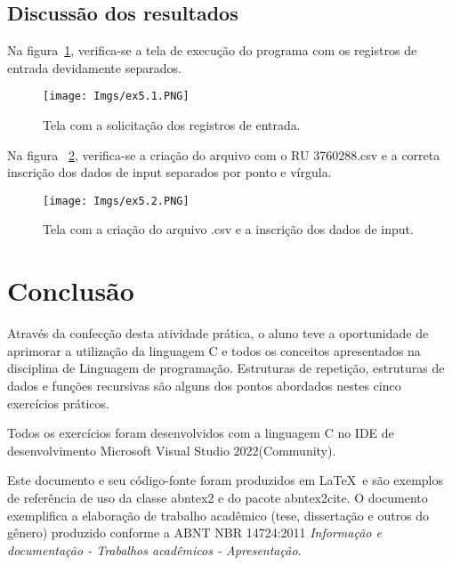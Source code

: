 \documentclass[
	12pt,				%
	openright,			%
	oneside,			%
	a4paper,			%
	chapter=TITLE,		%
	section=TITLE,		%
	english,			%
	french,				%
	spanish,			%
	brazil				%
	]{abntex2}
\begin{document}
\section[DISCUSSÃO DOS RESULTADOS]{Discussão dos resultados}

	Na figura~\ref{fig:ex5.1}, verifica-se a tela de execução do programa com os registros de entrada devidamente separados. 
	
	\begin{figure}[htp]
		\begin{center}
			\caption{Tela com a solicitação dos registros de entrada.}
			\texttt{[image: Imgs/ex5.1.PNG]}
			\label{fig:ex5.1}
		\end{center}
	\end{figure}

	Na figura ~\ref{fig:ex5.2}, verifica-se a criação do arquivo com o RU 3760288.csv e a correta inscrição dos dados de input separados por ponto e vírgula.

	\begin{figure}[htp]
		\begin{center}
			\caption{Tela com a criação do arquivo .csv e a inscrição dos dados de input.}
			\texttt{[image: Imgs/ex5.2.PNG]}
			\label{fig:ex5.2}
		\end{center}
	\end{figure}


\chapter*[CONCLUSÃO]{Conclusão}
	Através da confecção desta atividade prática, o aluno teve a oportunidade de aprimorar a utilização da linguagem C e todos os conceitos apresentados na disciplina de Linguagem de programação.	Estruturas de repetição, estruturas de dados e funções recursivas são alguns dos pontos abordados nestes cinco exercícios práticos.

	Todos os exercícios foram desenvolvidos com a linguagem C no IDE de desenvolvimento Microsoft Visual Studio 2022(Community).

	Este documento e seu código-fonte foram produzidos em \LaTeX\ e são exemplos de referência de uso da classe \textsf{abntex2} e do pacote \textsf{abntex2cite}. O documento exemplifica a elaboração de trabalho acadêmico (tese, dissertação e outros do gênero) produzido conforme a ABNT NBR 14724:2011 \emph{Informação e documentação - Trabalhos acadêmicos - Apresentação}.


% 
\end{document}
